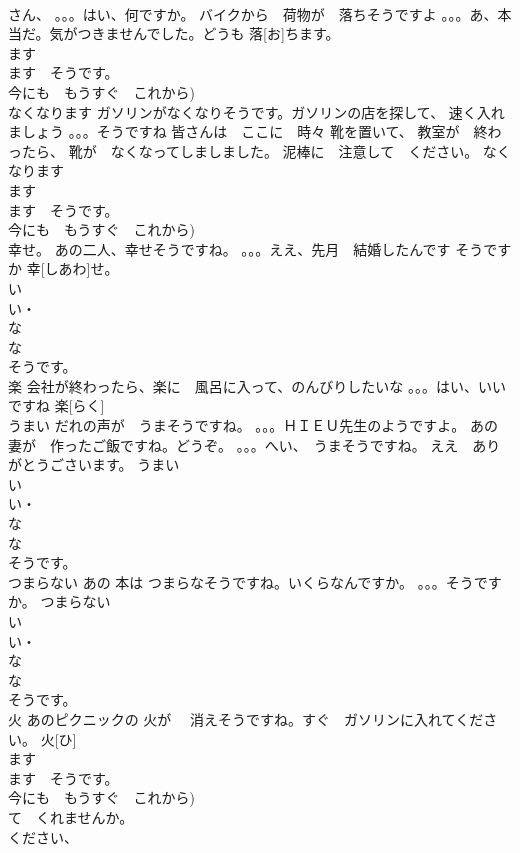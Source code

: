 \documentclass[8pt]{extreport}
\begin{document}
\begin{CJK}{UTF8}{min}
\\	さん、 。。。はい、何ですか。 バイクから　荷物が　落ちそうですよ 。。。あ、本当だ。気がつきませんでした。どうも	落[お]ちます。			
\\	ます　
\\	ます　そうです。
\\	今にも　もうすぐ　これから)	
\\	なくなります	ガソリンがなくなりそうです。ガソリンの店を探して、 速く入れましょう 。。。そうですね 皆さんは　ここに　時々 靴を置いて、 教室が　終わったら、 靴が　なくなってしましました。 泥棒に　注意して　ください。	なくなります			
\\	ます　
\\	ます　そうです。
\\	今にも　もうすぐ　これから)		
\\	幸せ。	あの二人、幸せそうですね。 。。。ええ、先月　結婚したんです そうですか	幸[しあわ]せ。			
\\	い　
\\	い・
\\	な 
\\	な 
\\	そうです。
\\	楽	会社が終わったら、楽に　風呂に入って、のんびりしたいな 。。。はい、いいですね	楽[らく]			
\\	うまい	だれの声が　うまそうですね。 。。。ＨＩＥＵ先生のようですよ。 あの　妻が　作ったご飯ですね。どうぞ。 。。。へい、　うまそうですね。 ええ　ありがとうごさいます。	うまい			
\\	い　
\\	い・
\\	な 
\\	な 
\\	そうです。
\\	つまらない	あの 本は つまらなそうですね。いくらなんですか。 。。。そうですか。	つまらない			
\\	い　
\\	い・
\\	な 
\\	な 
\\	そうです。
\\	火	あのピクニックの 火が　 消えそうですね。すぐ　ガソリンに入れてください。	火[ひ]			
\\	ます　
\\	ます　そうです。
\\	今にも　もうすぐ　これから) 
\\	て　くれませんか。
\\	ください、

\end{CJK}
\end{document}
